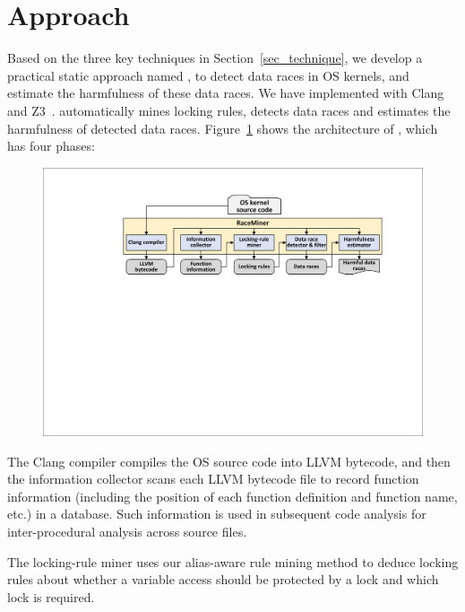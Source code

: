 \section{\sys Approach}
\label{sec_framework}

Based on the three key techniques in Section~\ref{sec_technique}, we develop a 
practical static approach named \sys, to detect data races in OS kernels, and 
estimate the harmfulness of these data races. We have implemented \sys with 
Clang~\cite{clang} and Z3~\cite{z3}. \sys automatically mines locking rules, 
detects data races and estimates the harmfulness of detected data races. 
Figure~\ref{fig_architecture} shows the architecture of \sys, which has four 
phases:

\begin{figure}[htbp]
	\centering
	\includegraphics[width=1\linewidth]{figures/fig_architecture.pdf}
	\label{fig_architecture}
\end{figure}

 The Clang compiler compiles the OS source 
code into LLVM bytecode, and then the information collector scans each LLVM 
bytecode file to record function information (including the position of each 
function definition and function name, etc.) in a database. Such information is 
used in subsequent code analysis for inter-procedural analysis across source 
files.

 The locking-rule miner uses our alias-aware rule 
mining method to deduce locking rules about whether a variable access should be 
protected by a lock and which lock is required.

